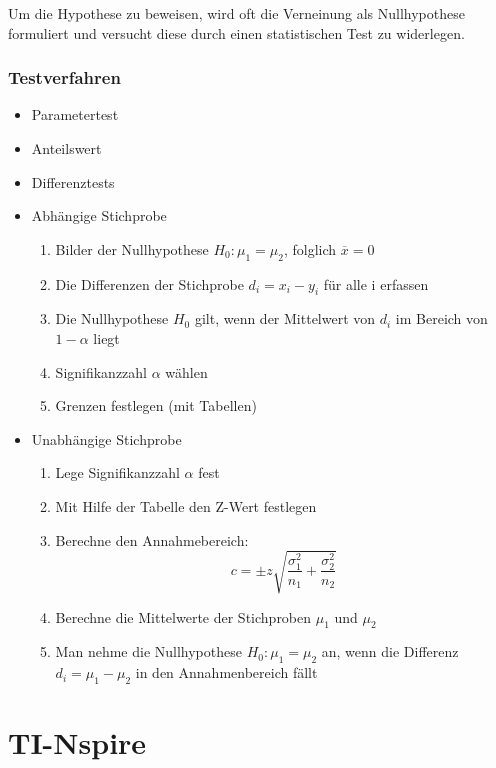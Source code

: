 \documentclass[11pt,twoside,landscape]{article}
\begin{document}
\begin{multicols}{3}
Um die Hypothese zu beweisen, wird oft die Verneinung als Nullhypothese formuliert und versucht diese durch einen statistischen Test zu widerlegen.

\subsubsection*{Testverfahren}
\label{sec:org6179ad0}
\begin{itemize}
\item Parametertest
\item Anteilswert
\item Differenztests
\end{itemize}
\begin{itemize}
\item Abhängige Stichprobe
\label{sec:org3eb6f56}
\begin{enumerate}
\item Bilder der Nullhypothese \(H_0: \mu_1 = \mu_2\), folglich \(\overline{x} = 0\)
\item Die Differenzen der Stichprobe \(d_i = x_i - y_i\) für alle i erfassen
\item Die Nullhypothese \(H_0\) gilt, wenn der Mittelwert von \(d_i\) im Bereich von \(1-\alpha\) liegt
\item Signifikanzzahl \(\alpha\) wählen
\item Grenzen festlegen (mit Tabellen)
\end{enumerate}
\item Unabhängige Stichprobe
\label{sec:orgfffcce8}
\begin{enumerate}
\item Lege Signifikanzzahl \(\alpha\) fest
\item Mit Hilfe der Tabelle den Z-Wert festlegen
\item Berechne den Annahmebereich:
\begin{equation*}
  c = \pm z \sqrt{\frac{\sigma_1^2}{n_1}+\frac{\sigma_2^2}{n_2}}
\end{equation*}

\item Berechne die Mittelwerte der Stichproben \(\mu_1\) und \(\mu_2\)
\item Man nehme die Nullhypothese \(H_0: \mu_1 = \mu_2\) an, wenn die Differenz \(d_i = \mu_1 - \mu_2\) in den Annahmenbereich fällt
\end{enumerate}
\end{itemize}


\section*{TI-Nspire}
\label{sec:orgf440a9e}

\end{multicols}
\end{document}
